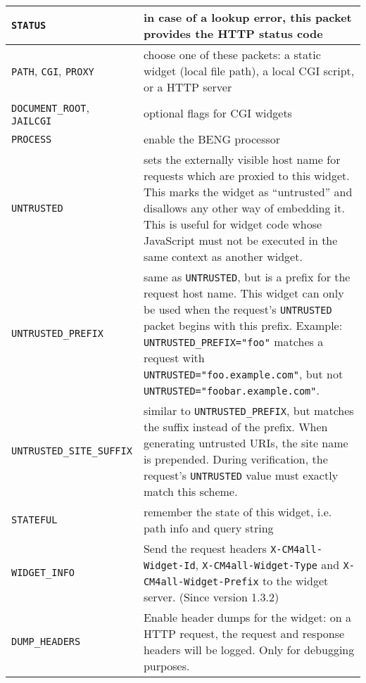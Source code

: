 \documentclass[a4paper,12pt]{article}
\begin{document}
\begin{longtable}{|l|p{8cm}|}
\hline
\verb|STATUS| & in case of a lookup error, this packet provides the
HTTP status code \\
\hline

\verb|PATH|, \verb|CGI|, \verb|PROXY| & choose one of these
packets: a static widget (local file path), a local CGI script, or a
HTTP server \\

\hline

\verb|DOCUMENT_ROOT|, \verb|JAILCGI| & optional flags for CGI
widgets \\

\hline
\verb|PROCESS| & enable the BENG processor \\

\hline

\verb|UNTRUSTED| & sets the externally visible host name for requests
which are proxied to this widget.  This marks the widget as
``untrusted'' and disallows any other way of embedding it.  This is
useful for widget code whose JavaScript must not be executed in the
same context as another widget. \\

\hline

\verb|UNTRUSTED_PREFIX| & same as \verb|UNTRUSTED|, but is a
prefix for the request host name.  This widget can only be used when
the request's \verb|UNTRUSTED| packet begins with this prefix.
Example: \verb|UNTRUSTED_PREFIX="foo"| matches a request with
\verb|UNTRUSTED="foo.example.com"|, but not
\verb|UNTRUSTED="foobar.example.com"|. \\

\hline

\verb|UNTRUSTED_SITE_SUFFIX| & similar to
\verb|UNTRUSTED_PREFIX|, but matches the suffix instead of the
prefix.  When generating untrusted URIs, the site name is prepended.
During verification, the request's \verb|UNTRUSTED| value must
exactly match this scheme. \\

\hline

\verb|STATEFUL| & remember the state of this widget, i.e. path info
and query string \\

\hline

\verb|WIDGET_INFO| & Send the request headers
\verb|X-CM4all-Widget-Id|, \verb|X-CM4all-Widget-Type| and
\verb|X-CM4all-Widget-Prefix| to the widget server.
\scriptsize{(Since version 1.3.2)}\\

\hline

\verb|DUMP_HEADERS| & Enable header dumps for the widget: on a HTTP
request, the request and response headers will be logged.  Only for
debugging purposes. \\

\hline
\end{longtable}
\end{document}
